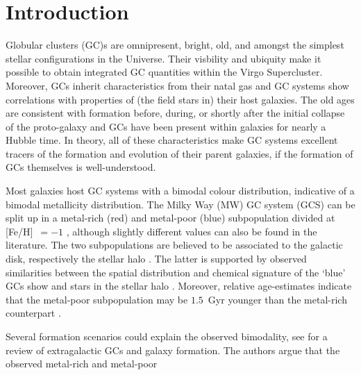 \documentclass[a4paper,fleqn,usenatbib]{mnras}
\begin{document}
\section{Introduction}
Globular clusters (GC)s are omnipresent, bright, old, and amongst the simplest
stellar configurations in the Universe. Their visbility and ubiquity make it
possible to obtain integrated GC quantities within the Virgo Supercluster.
Moreover, GCs inherit characteristics from their natal gas and GC systems show
correlations with properties of (the field stars in) their host galaxies.
The old ages
are consistent with formation before, during, or shortly after the initial
collapse of the proto-galaxy and GCs have been present within galaxies for nearly
a Hubble time. In theory, all of these characteristics make GC systems excellent
tracers of the formation and evolution of their parent galaxies, if the formation
of GCs themselves is well-understood.

Most galaxies host GC systems with a bimodal colour distribution, indicative of
a bimodal metallicity distribution. The Milky Way (MW) GC system (GCS) can be
split up in a metal-rich (red) and metal-poor (blue) subpopulation divided at
[Fe/H]~$=-1$ \citep[e.g.][]{Harris2001}, although slightly different values can
also be found in the literature. The two subpopulations are believed to be
associated to the galactic disk, respectively the stellar halo
\citep[e.g.][]{1985ApJ...293..424Z}. The latter is supported by observed similarities
between the spatial distribution and chemical signature of the `blue' GCs show
and stars in the stellar halo \citep{2008A&ARv..15..145H}. Moreover, relative
age-estimates indicate that the metal-poor subpopulation may be $1.5$~Gyr younger
than the metal-rich counterpart \citep{2005AJ....130..116D}.

Several formation scenarios could explain the observed bimodality, see
\citet{2006ARA&A..44..193B} for a review of extragalactic GCs and galaxy
formation. The authors argue that the observed metal-rich and metal-poor


%
%
\end{document}

